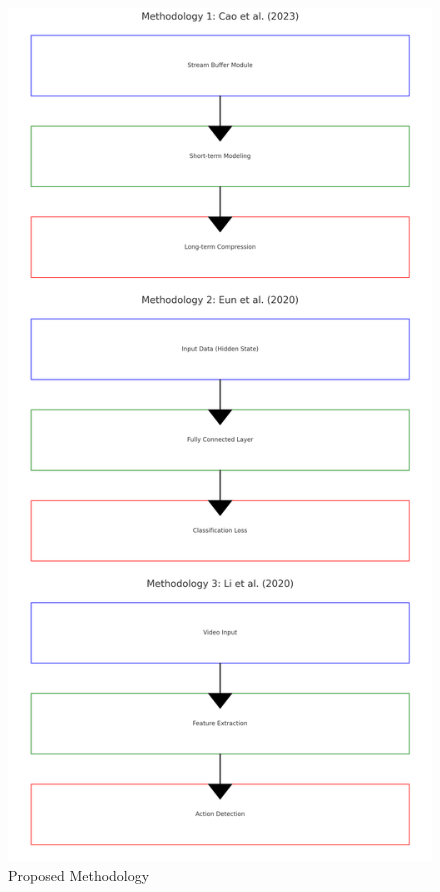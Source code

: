 \begin{figure}[htbp]
    \centering
    \includegraphics[width=4.5in]{img/method.png}
    \caption{Proposed Methodology}
    \label{fig:example}
\end{figure}




